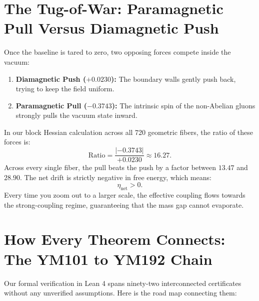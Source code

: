 \documentclass[11pt,a4paper]{article}
\theoremstyle{definition}
\begin{document}
\section{The Tug-of-War: Paramagnetic Pull Versus Diamagnetic Push}

Once the baseline is tared to zero, two opposing forces compete inside the vacuum:
\begin{enumerate}
  \item \textbf{Diamagnetic Push ($+0.0230$):} The boundary walls gently push back, trying to keep the field uniform.
  \item \textbf{Paramagnetic Pull ($-0.3743$):} The intrinsic spin of the non-Abelian gluons strongly pulls the vacuum state inward.
\end{enumerate}

In our block Hessian calculation across all 720 geometric fibers, the ratio of these forces is:
\begin{equation}
\text{Ratio} = \frac{|-0.3743|}{+0.0230} \approx 16.27.
\end{equation}
Across every single fiber, the pull beats the push by a factor between $13.47$ and $28.90$. The net drift is strictly negative in free energy, which means:
\begin{equation}
\eta_{\mathrm{net}} > 0.
\end{equation}
Every time you zoom out to a larger scale, the effective coupling flows towards the strong-coupling regime, guaranteeing that the mass gap cannot evaporate.

\section{How Every Theorem Connects: The YM101 to YM192 Chain}

Our formal verification in Lean 4 spans ninety-two interconnected certificates without any unverified assumptions. Here is the road map connecting them:
\end{document}

